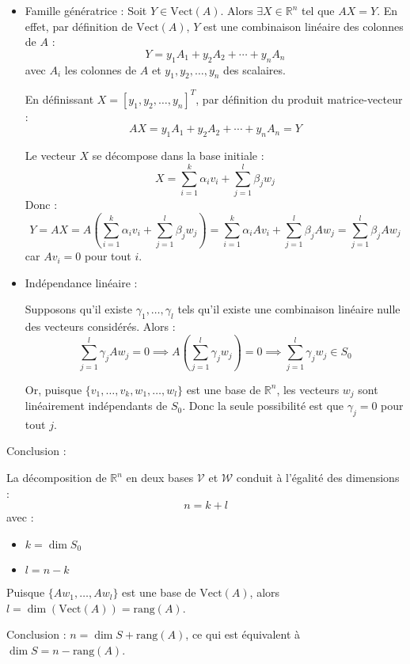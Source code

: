 \documentclass[10pt,a4paper]{article}
\begin{document}
\begin{itemize}
    \item Famille génératrice : Soit $Y \in \text{Vect}(A)$. Alors $\exists X \in \mathbb{R}^n$ tel
    que $AX = Y$. En effet, par définition de $\text{Vect}(A)$, $Y$ est une combinaison linéaire des
    colonnes de $A$ :
        $$Y = y_1 A_1 + y_2 A_2 + \cdots + y_n A_n$$ avec $A_i$ les colonnes de $A$ et $y_1, y_2,
        \ldots, y_n$ des scalaires.

        En définissant $X = [y_1, y_2, \ldots, y_n]^T$, par définition du produit matrice-vecteur :
        $$AX = y_1 A_1 + y_2 A_2 + \cdots + y_n A_n = Y$$

    Le vecteur $X$ se décompose dans la base initiale :
    $$X = \sum_{i=1}^k \alpha_i v_i + \sum_{j=1}^l \beta_j w_j$$ Donc : $$Y = AX = A
    \left(\sum_{i=1}^k \alpha_i v_i + \sum_{j=1}^l \beta_j w_j \right) = \sum_{i=1}^k \alpha_i Av_i
    + \sum_{j=1}^l \beta_j Aw_j = \sum_{j=1}^l \beta_j Aw_j$$ car $Av_i = 0$ pour tout $i$.

    \item Indépendance linéaire :

    Supposons qu'il existe $\gamma_1, \ldots, \gamma_l$ tels qu'il existe une combinaison linéaire
    nulle des vecteurs considérés. Alors :
    $$ \sum_{j=1}^l \gamma_j Aw_j = 0 \implies A \left(\sum_{j=1}^l \gamma_j w_j \right) = 0
    \implies \sum_{j=1}^l \gamma_j w_j \in S_0 $$

    Or, puisque $\{v_1, \ldots, v_k, w_1, \ldots, w_l\}$ est une base de $\mathbb{R}^n$, les
    vecteurs $w_j$ sont linéairement indépendants de $S_0$. Donc la seule possibilité est que
    $\gamma_j = 0$ pour tout $j$.
\end{itemize}

\q Conclusion :

La décomposition de $\mathbb{R}^n$ en deux bases $\mathcal{V}$ et $\mathcal{W}$ conduit à l'égalité
des dimensions :
$$ n = k + l $$ avec :
\begin{itemize}
    \item $k = \dim S_0$
    \item $l = n - k$
\end{itemize}

Puisque $\{Aw_1, \ldots, Aw_l\}$ est une base de $\text{Vect}(A)$, alors $l = \dim(\text{Vect}(A)) =
\text{rang}(A)$.

Conclusion : $n = \dim S + \text{rang}(A)$, ce qui est équivalent à $\dim S = n - \text{rang}(A)$.
\end{document}
